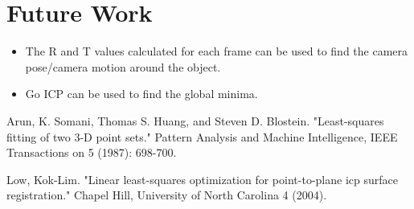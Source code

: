 \documentclass[letterpaper, 10 pt, conference]{ieeeconf}  %
\begin{document}
\section{Future Work}
\begin{itemize}
\item The R and T values calculated for each frame can be used to find the camera pose/camera motion around the object.
\item Go ICP can be used to find the global minima.
\end{itemize}

\begin{thebibliography}{99}

 Arun, K. Somani, Thomas S. Huang, and Steven D. Blostein. "Least-squares fitting of two 3-D point sets." Pattern Analysis and Machine Intelligence, IEEE Transactions on 5 (1987): 698-700.

Low, Kok-Lim. "Linear least-squares optimization for point-to-plane icp surface registration." Chapel Hill, University of North Carolina 4 (2004).


\end{thebibliography}
\end{document}
